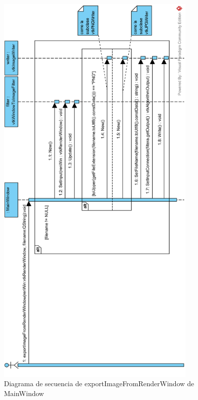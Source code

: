 \begin{figure}[H]
	\centering
	\includegraphics[height=20cm]{imagenes/diagramas/secuencia/MainWindow_ExportImageFromRenderWindow}
	\caption{Diagrama de secuencia de exportImageFromRenderWindow de MainWindow}
	\label{fig:diagrama_secuencia_mainWindow_exportImageFromRenderWindow}
\end{figure}

